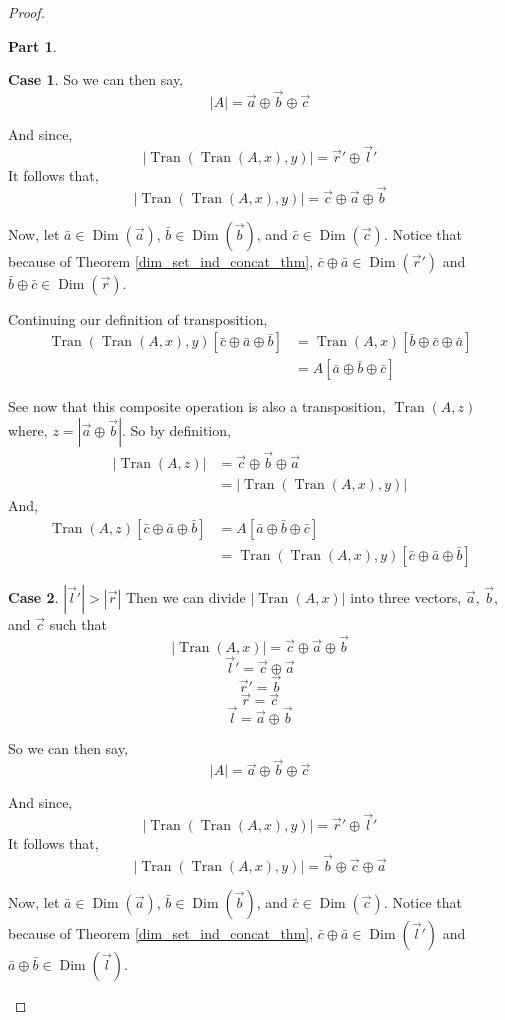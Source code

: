 \documentclass[12pt]{book}
\theoremstyle{plain}
\theoremstyle{definition}
\theoremstyle{ppart}
\newtheorem{ppart}{Part}
\theoremstyle{case}
\newtheorem{case}{Case}
\theoremstyle{solution}
\DeclareMathOperator{\Dim}{Dim}
\DeclareMathOperator{\Tran}{Tran}
\newcommand{\shape}[1]{\left|#1\right|}
\begin{document}
\begin{proof}
\begin{ppart}
\begin{case}
So we can then say,
\[ \shape{A} = \vec{a} \oplus \vec{b} \oplus \vec{c} \]

And since,
\[ \shape{\Tran(\Tran(A, x), y)} = \vec{r}' \oplus \vec{l}' \]
It follows that,
\[ \shape{\Tran(\Tran(A, x), y)} = \vec{c} \oplus \vec{a} \oplus \vec{b} \]

Now, let $\bar{a} \in \Dim(\vec{a})$, $\bar{b} \in \Dim(\vec{b})$, and
$\bar{c} \in \Dim(\vec{c})$. Notice that because of Theorem 
\ref{dim_set_ind_concat_thm}, $\bar{c} \oplus \bar{a} \in \Dim(\vec{r}')$ and
$\bar{b} \oplus \bar{c} \in \Dim(\vec{r})$.

Continuing our definition of transposition,
\begin{align*}
  \Tran(\Tran(A, x), y)[\bar{c} \oplus \bar{a} \oplus \bar{b}]
  &=
  \Tran(A, x)[\bar{b} \oplus \bar{c} \oplus \bar{a}] \\
  &=
  A[\bar{a} \oplus \bar{b} \oplus \bar{c}]
\end{align*}

See now that this composite operation is also a transposition, $\Tran(A, z)$ where,
$z = \shape{\vec{a} \oplus \vec{b}}$.
So by definition,
\begin{align*}
  \shape{\Tran(A, z)}
  &=
  \vec{c} \oplus \vec{b} \oplus \vec{a} \\
  &=
  \shape{\Tran(\Tran(A, x), y)}  
\end{align*}
And,
\begin{align*}
  \Tran(A, z)[\bar{c} \oplus \bar{a} \oplus \bar{b}]
  &=
  A[\bar{a} \oplus \bar{b} \oplus \bar{c}] \\
  &=
  \Tran(\Tran(A, x), y)[\bar{c} \oplus \bar{a} \oplus \bar{b}]
\end{align*}
\end{case}

\begin{case} $\shape{\vec{l}'} > \shape{\vec{r}}$
Then we can divide $\shape{\Tran(A,x)}$ into three vectors, $\vec{a}$, $\vec{b}$, and $\vec{c}$
such that
\[ \shape{\Tran(A,x)} = \vec{c} \oplus \vec{a} \oplus \vec{b} \]
\[ \vec{l}' = \vec{c} \oplus \vec{a} \]
\[ \vec{r}' = \vec{b} \]
\[ \vec{r} = \vec{c} \]
\[ \vec{l} = \vec{a} \oplus \vec{b} \]

So we can then say,
\[ \shape{A} = \vec{a} \oplus \vec{b} \oplus \vec{c} \]

And since,
\[ \shape{\Tran(\Tran(A, x), y)} = \vec{r}' \oplus \vec{l}' \]
It follows that,
\[ \shape{\Tran(\Tran(A, x), y)} = \vec{b} \oplus \vec{c} \oplus \vec{a} \]

Now, let $\bar{a} \in \Dim(\vec{a})$, $\bar{b} \in \Dim(\vec{b})$, and
$\bar{c} \in \Dim(\vec{c})$. Notice that because of Theorem 
\ref{dim_set_ind_concat_thm}, $\bar{c} \oplus \bar{a} \in \Dim(\vec{l}')$ and
$\bar{a} \oplus \bar{b} \in \Dim(\vec{l})$.


\end{case}
\end{ppart}
\end{proof}
\end{document}
